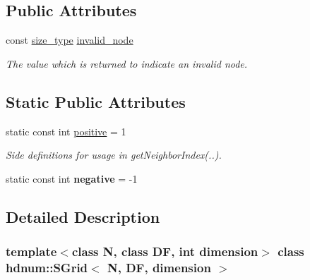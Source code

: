 \subsection*{Public Attributes}
\begin{DoxyCompactItemize}
\item 
\hypertarget{classhdnum_1_1SGrid_aedaa35a3ac460551ba71aabebf411b5d}{
const \hyperlink{classhdnum_1_1SGrid_aba7c973b280ecd56f211ac4b8d746280}{size\_\-type} \hyperlink{classhdnum_1_1SGrid_aedaa35a3ac460551ba71aabebf411b5d}{invalid\_\-node}}
\label{classhdnum_1_1SGrid_aedaa35a3ac460551ba71aabebf411b5d}

\begin{DoxyCompactList}\small\item\em The value which is returned to indicate an invalid node. \item\end{DoxyCompactList}\end{DoxyCompactItemize}
\subsection*{Static Public Attributes}
\begin{DoxyCompactItemize}
\item 
\hypertarget{classhdnum_1_1SGrid_a0824662b4e8828f13b1600a4226e82a0}{
static const int \hyperlink{classhdnum_1_1SGrid_a0824662b4e8828f13b1600a4226e82a0}{positive} = 1}
\label{classhdnum_1_1SGrid_a0824662b4e8828f13b1600a4226e82a0}

\begin{DoxyCompactList}\small\item\em Side definitions for usage in getNeighborIndex(..). \item\end{DoxyCompactList}\item 
\hypertarget{classhdnum_1_1SGrid_a4e9a18163df1318fc15ac094ac28196b}{
static const int {\bfseries negative} = -\/1}
\label{classhdnum_1_1SGrid_a4e9a18163df1318fc15ac094ac28196b}

\end{DoxyCompactItemize}


\subsection{Detailed Description}
\subsubsection*{template$<$class N, class DF, int dimension$>$ class hdnum::SGrid$<$ N, DF, dimension $>$}

